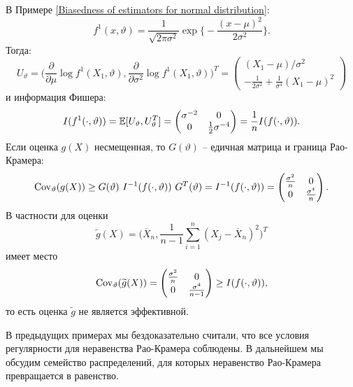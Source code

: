 \begin{exmp} \label{exmp2.29}
	В Примере \ref{Biasedness of estimators for normal distribution}:
	\[ f^1(x,\vartheta)=\frac{1}{\sqrt{2\pi \sigma^2}} \exp\Big \{-\frac{(x-\mu)^2}{2\sigma^2}\Big \}. \]
	Тогда:
	\[U_\vartheta = \Big(\frac{\partial}{\partial \mu} \log f^1(X_1,\vartheta), \frac{\partial}{\partial \sigma^2} \log f^1(X_1,\vartheta)\Big)^T = 
	\begin{pmatrix}
	(X_1-\mu)/\sigma^2 \\
	-\frac{1}{2\sigma^2}+\frac{1}{\sigma^4}(X_1-\mu)^2
	\end{pmatrix}  \]
	и информация Фишера:
	\[ I(f^1(\cdot, \vartheta))=\mathbb{E}[U_\vartheta, U_\vartheta^T]=
	\begin{pmatrix}
	\sigma^{-2} & 0 \\
	0 & \frac{1}{2}\sigma^{-4}
	\end{pmatrix}
	= \frac{1}{n}I(f(\cdot, \vartheta)).
	 \]
	 Если оценка $g(X)$ несмещенная, то $G(\vartheta)$ -- едичная матрица и граница Рао-Крамера:
	 \[ \mathrm{Cov}_\vartheta(g(X)) \geq G(\vartheta) \  I^{-1} (f(\cdot, \vartheta)) \   G^T(\vartheta)=I^{-1}(f(\cdot, \vartheta))=
	 \begin{pmatrix}
	 \frac{\sigma^{2}}{n} & 0 \\
	 0 & \frac{\sigma^{4}}{n}
	 \end{pmatrix}. \]
	 В частности для оценки
	 \[ \widetilde{g}(X)=\Big(\overline{X}_n, \frac{1}{n-1} \sum_{i=1}^n(X_j-\overline{X}_n)^2 \Big)^T \]
	 имеет место
	 \[ \mathrm{Cov}_\vartheta(\widetilde{g}(X)) = 
	 \begin{pmatrix}
	 \frac{\sigma^{2}}{n} & 0 \\
      0 & \frac{\sigma^{4}}{n-1}
	 \end{pmatrix} \geq I(f(\cdot, \vartheta)), \]
	 то есть оценка $\widetilde{g}$ не является эффективной.
\end{exmp}

\begin{rmrk}
	В предыдущих примерах мы бездоказательно считали, что все условия регулярности для неравенства Рао-Крамера соблюдены. В дальнейшем мы обсудим семейство распределений, для которых неравенство Рао-Крамера превращается в равенство.
\end{rmrk}


